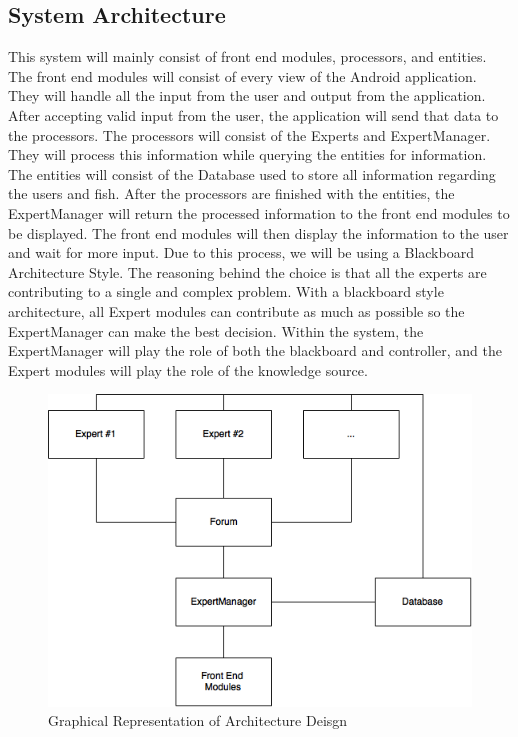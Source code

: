 \documentclass[]{article}
\begin{document}
\subsection{System Architecture}
\label{sub:system_architecture}
This system will mainly consist of front end modules, processors, and entities.
The front end modules will consist of every view of the Android application. They will handle all the input from the user and output from the application. After accepting valid input from the user, the application will send that data to the processors. The processors will consist of the Experts and ExpertManager. They will process this information while querying the entities for information. The entities will consist of the Database used to store all information regarding the users and fish. After the processors are finished with the entities, the ExpertManager will return the processed information to the front end modules to be displayed. The front end modules will then display the information to the user and wait for more input. Due to this process, we will be using a Blackboard Architecture Style. The reasoning behind the choice is that all the experts are contributing to a single and complex problem. With a blackboard style architecture, all Expert modules can contribute as much as possible so the ExpertManager can make the best decision. Within the system, the ExpertManager will play the role of both the blackboard and controller, and the Expert modules will play the role of the knowledge source.

\begin{figure}
\includegraphics[width=\textwidth]{ArchDesign}
\caption{Graphical Representation of Architecture Deisgn}
\end{figure}
\end{document}

